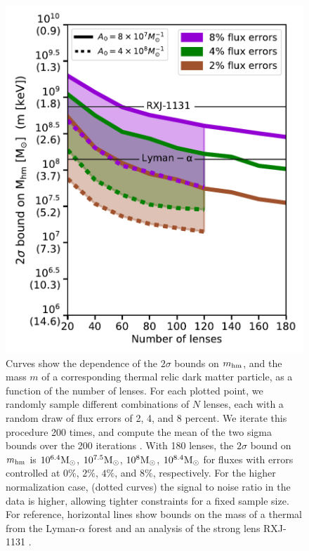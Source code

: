 \begin{figure}
	\centering
	\includegraphics[clip,trim=0cm 0cm 0cm
	0cm,width=.75\textwidth,keepaspectratio]{./figures_ABCforward/nlens_vs_2sigma.pdf}
	\caption[Projected constraints on the half-mode mass as a function of the number of lenses and measurement uncertainties]{\label{fig:nlens_vs_2sigma} Curves show the dependence of the $2\sigma$ bounds on $m_{\rm{hm}}$, and the mass $m$ of a corresponding thermal relic dark matter particle, as a function of the number of lenses. For each plotted point, we randomly sample different combinations of $N$ lenses, each with a random draw of flux errors of 2, 4, and 8 percent. We iterate this procedure 200 times, and compute the mean of the two sigma bounds over the 200 iterations . %
		With 180 lenses, the $2\sigma$ bound on $m_{\rm{hm}}$ is $10^{6.4} {\rm{M}_{\odot}}$, $10^{7.5} {\rm{M}_{\odot}}$, $10^{8} {\rm{M}_{\odot}}$, $10^{8.4} {\rm{M}_{\odot}}$ for fluxes with errors controlled at $0\%$, $2\%$, $4\%$, and $8\%$, respectively. For the higher normalization case, (dotted curves) the signal to noise ratio in the data is higher, allowing tighter constraints for a fixed sample size. For reference, horizontal lines show bounds on the mass of a thermal from the Lyman-$\alpha$ forest \citep{Viel13} and an analysis of the strong lens RXJ-1131 \citep{Birrer++17a}.}
\end{figure}

